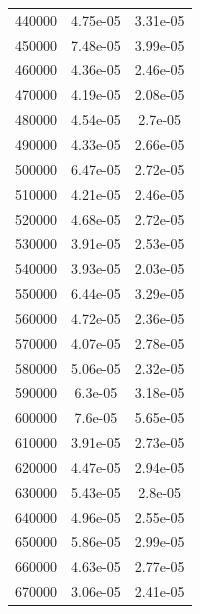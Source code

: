 \documentclass{article}
\begin{document}
\begin{longtable}{c|c|c}
           440000 &               4.75e-05 &               3.31e-05 \\
           450000 &               7.48e-05 &               3.99e-05 \\
           460000 &               4.36e-05 &               2.46e-05 \\
           470000 &               4.19e-05 &               2.08e-05 \\
           480000 &               4.54e-05 &               2.7e-05  \\
           490000 &               4.33e-05 &               2.66e-05 \\
           500000 &               6.47e-05 &               2.72e-05 \\
           510000 &               4.21e-05 &               2.46e-05 \\
           520000 &               4.68e-05 &               2.72e-05 \\
           530000 &               3.91e-05 &               2.53e-05 \\
           540000 &               3.93e-05 &               2.03e-05 \\
           550000 &               6.44e-05 &               3.29e-05 \\
           560000 &               4.72e-05 &               2.36e-05 \\
           570000 &               4.07e-05 &               2.78e-05 \\
           580000 &               5.06e-05 &               2.32e-05 \\
           590000 &               6.3e-05  &               3.18e-05 \\
           600000 &               7.6e-05  &               5.65e-05 \\
           610000 &               3.91e-05 &               2.73e-05 \\
           620000 &               4.47e-05 &               2.94e-05 \\
           630000 &               5.43e-05 &               2.8e-05  \\
           640000 &               4.96e-05 &               2.55e-05 \\
           650000 &               5.86e-05 &               2.99e-05 \\
           660000 &               4.63e-05 &               2.77e-05 \\
           670000 &               3.06e-05 &               2.41e-05 \\

\end{longtable}
\end{document}
